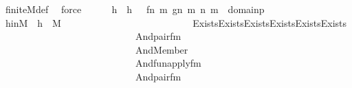 \begin{isabellebody}
\ finite{\isacharunderscore}{\kern0pt}M{\isacharunderscore}{\kern0pt}def\ \isamarkupfalse%
\ force\isanewline
\isanewline
\ \ \ \ \isamarkupfalse%
\ h\ \ {\isachardoublequoteopen}h\ {\isasymequiv}\ {\isacharbraceleft}{\kern0pt}\ {\isacharless}{\kern0pt}{\isacharless}{\kern0pt}f{\isacharbackquote}{\kern0pt}n{\isacharcomma}{\kern0pt}\ m{\isachargreater}{\kern0pt}{\isacharcomma}{\kern0pt}\ g{\isacharbackquote}{\kern0pt}{\isacharless}{\kern0pt}n{\isacharcomma}{\kern0pt}\ m{\isachargreater}{\kern0pt}{\isachargreater}{\kern0pt}{\isachardot}{\kern0pt}\ {\isacharless}{\kern0pt}n{\isacharcomma}{\kern0pt}\ m{\isachargreater}{\kern0pt}\ {\isasymin}\ domain{\isacharparenleft}{\kern0pt}p{\isacharparenright}{\kern0pt}\ {\isacharbraceright}{\kern0pt}{\isachardoublequoteclose}\isanewline
\isanewline
\ \ \ \ \isamarkupfalse%
\ hinM\ {\isacharcolon}{\kern0pt}\ {\isachardoublequoteopen}h\ {\isasymin}\ M{\isachardoublequoteclose}\ \isanewline
\ \ \ \ \isamarkupfalse%
\ {\isacharminus}{\kern0pt}\ \isanewline
\ \ \ \ \ \ \isanewline
\ \ \ \ \ \ \isamarkupfalse%
\ {\isasymphi}\ \ {\isachardoublequoteopen}{\isasymphi}\ {\isasymequiv}\ Exists{\isacharparenleft}{\kern0pt}Exists{\isacharparenleft}{\kern0pt}Exists{\isacharparenleft}{\kern0pt}Exists{\isacharparenleft}{\kern0pt}Exists{\isacharparenleft}{\kern0pt}Exists{\isacharparenleft}{\kern0pt}\isanewline
\ \ \ \ \ \ \ \ \ \ \ \ \ \ \ \ \ \ \ \ \ \ \ \ \ \ \ \ And{\isacharparenleft}{\kern0pt}pair{\isacharunderscore}{\kern0pt}fm{\isacharparenleft}{\kern0pt}{}{\isacharcomma}{\kern0pt}\ {}{\isacharcomma}{\kern0pt}\ {}{\isacharparenright}{\kern0pt}{\isacharcomma}{\kern0pt}\ \isanewline
\ \ \ \ \ \ \ \ \ \ \ \ \ \ \ \ \ \ \ \ \ \ \ \ \ \ \ \ And{\isacharparenleft}{\kern0pt}Member{\isacharparenleft}{\kern0pt}{}{\isacharcomma}{\kern0pt}\ {}{\isacharparenright}{\kern0pt}{\isacharcomma}{\kern0pt}\isanewline
\ \ \ \ \ \ \ \ \ \ \ \ \ \ \ \ \ \ \ \ \ \ \ \ \ \ \ \ And{\isacharparenleft}{\kern0pt}fun{\isacharunderscore}{\kern0pt}apply{\isacharunderscore}{\kern0pt}fm{\isacharparenleft}{\kern0pt}{}{\isacharcomma}{\kern0pt}\ {}{\isacharcomma}{\kern0pt}\ {}{\isacharparenright}{\kern0pt}{\isacharcomma}{\kern0pt}\ \isanewline
\ \ \ \ \ \ \ \ \ \ \ \ \ \ \ \ \ \ \ \ \ \ \ \ \ \ \ \ And{\isacharparenleft}{\kern0pt}pair{\isacharunderscore}{\kern0pt}fm{\isacharparenleft}{\kern0pt}{}{\isacharcomma}{\kern0pt}\ {}{\isacharcomma}{\kern0pt}\ {}{\isacharparenright}{\kern0pt}{\isacharcomma}{\kern0pt}\ \isanewline

\end{isabellebody}
